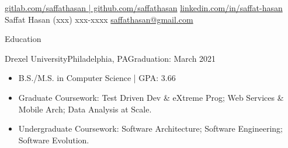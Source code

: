 \documentclass[]{mcdowellcv}
\begin{document}
	\makeheader
		{\href{https://gitlab.com/saffathasan | github.com/saffathasan}{gitlab.com/saffathasan | github.com/saffathasan} \linebreak \href{https://linkedin.com/in/saffat-hasan}{linkedin.com/in/saffat-hasan}}
		{Saffat Hasan}
		{(xxx) xxx-xxxx \linebreak \href{mailto:saffathasan@gmail.com}{saffathasan@gmail.com}}
	
	\begin{cvsection}{Education}
		\begin{cvsubsection}{Drexel University}{Philadelphia, PA}{Graduation: March 2021}
			\begin{itemize}
				\item B.S./M.S. in Computer Science | GPA: 3.66
				\item Graduate Coursework: Test Driven Dev \& eXtreme Prog; Web Services \& Mobile Arch; Data Analysis at Scale.
				\item Undergraduate Coursework: Software Architecture; Software Engineering; Software Evolution.
			\end{itemize}
		\end{cvsubsection}
	\end{cvsection}
\end{document}
